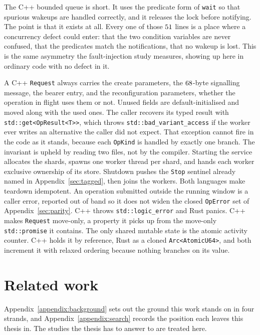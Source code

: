\documentclass[english,oneside,a4paper,censored,csm,software-track-2020]{HYthesisML}
\begin{document}
\begin{appendices}
The C++ bounded queue is short. It uses the predicate form of \texttt{wait} so that spurious
wakeups are handled correctly, and it releases the lock before notifying. The point is that it
exists at all. Every one of those $51$ lines is a place where a concurrency
defect could enter: that the two condition variables are never confused, that the predicates
match the notifications, that no wakeup is lost. This is the same asymmetry the fault-injection
study measures, showing up here in ordinary code with no defect in it.

A C++ \texttt{Request} always carries the create parameters, the $68$-byte
signalling message, the bearer entry, and the reconfiguration parameters, whether the operation
in flight uses them or not. Unused fields are default-initialised and moved along with the used
ones. The caller recovers its typed result with \texttt{std::get<OpResult<T>>}, which throws
\texttt{std::bad\_variant\_access} if the worker ever writes an alternative the caller did not
expect. That exception cannot fire in the code as it stands, because each \texttt{OpKind} is
handled by exactly one branch. The invariant is upheld by reading two files, not by the
compiler. Starting the service allocates the shards, spawns one worker thread per shard, and
hands each worker exclusive ownership of its store. Shutdown pushes the \texttt{Stop} sentinel
already named in Appendix~\ref{sec:tagged}, then joins the workers. Both languages make teardown
idempotent. An operation submitted outside the running window is a caller error, reported out of
band so it does not widen the closed \texttt{OpError} set of Appendix~\ref{sec:parity}. C++ throws
\texttt{std::logic\_error} and Rust panics. C++ makes \texttt{Request} move-only, a property it
picks up from the move-only \texttt{std::promise} it contains. The only shared mutable state is
the atomic activity counter. C++ holds it by reference, Rust as a cloned
\texttt{Arc<AtomicU64>}, and both increment it with relaxed ordering because nothing branches on
its value.

\section{Related work}\label{sec:relatedwork}
Appendix~\ref{appendix:background} sets out the ground this work stands on in four strands, and
Appendix~\ref{appendix:search} records the position each leaves this thesis in. The studies the
thesis has to answer to are treated here.


\end{appendices}
\end{document}
